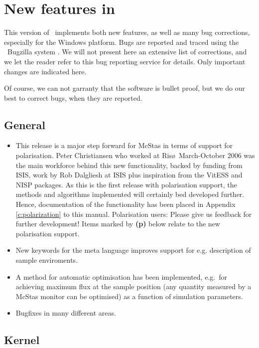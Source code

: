 
\chapter{New features in \MCS\ \version\ }
\label{c:changes}

This version of \MCS\ implements both new features, as well as many bug corrections, especially for the Windows platform. Bugs are reported and traced using the \MCS\ Bugzilla system \cite{mczilla_webpage}. We will not present here an extensive list of corrections, and we let the reader refer to this bug reporting service for details. Only important changes are indicated here.

Of course, we can not garranty that the software is bullet proof, but we do our best to correct bugs, when they are reported.

\section{General}
\label{s:new-features:general}
\begin{itemize}
\item  This release is a major step forward for McStas in terms of
  support for polarisation. Peter Christiansen who worked at Ris\o\
  March-October 2006 was the main workforce behind this new
  functionality, backed by funding from ISIS, work by Rob Dalgliesh at
  ISIS plus inspiration from the VitESS and NISP packages. As this is
  the first release with polarisation support, the methods and
  algorithms implemented will certainly bed developed further. Hence,
  documentation of the functionality has been placed in Appendix
  \ref{c:polarization} to this manual. Polarisation users: Please give
  us feedback for further development! Items marked by {\bf(p)} below
  relate to the new polarisation support. 
\item New keywords for the meta language improves support for e.g. description of sample enviroments.
\item A method for automatic optimisation has been implemented, e.g.~for achieving maximum flux at the sample position (any quantity measured by a McStas monitor can be optimised) as a function of simulation parameters.
\item Bugfixes in many different areas.
\end{itemize}
\section{Kernel}
\label{s:new-features:kernel}

